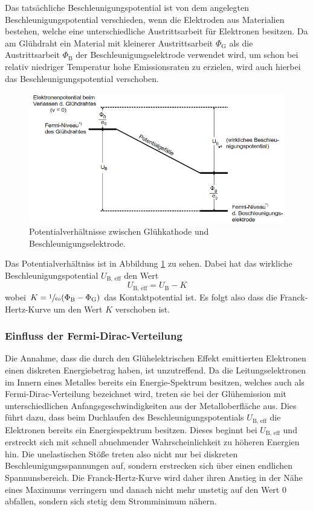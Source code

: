 Das tatsächliche Beschleunigungspotential ist von dem angelegten Beschleunigungspotential
verschieden, wenn die Elektroden aus Materialien bestehen, welche eine unterschiedliche Austrittsarbeit für Elektronen besitzen.
Da am Glühdraht ein Material mit kleinerer Austrittsarbeit $\Phi_\text{G}$ als die Austrittsarbeit $\Phi_\text{B}$ der Beschleunigungselektrode verwendet wird, um schon bei relativ niedriger Temperatur hohe Emissionsraten zu erzielen, wird auch hierbei
das Beschleunigungspotential verschoben. 
\begin{figure}
    \centering
    \caption{Potentialverhältnisse zwischen Glühkathode und Beschleunigungselektrode.\cite{v601}}
    \label{fig:verh}
    \includegraphics[width = 0.6 \textwidth]{pics/potdif.png}
\end{figure}
Das Potentialverhältniss ist in Abbildung \ref{fig:verh} zu sehen. Dabei hat das wirkliche Beschleunigungspotential $U_\text{B, eff}$ den Wert
\begin{equation}
    U_\text{B, eff}= U_\text{B} - K
\end{equation}
wobei $K = \sfrac{1}{e_0} (\Phi_\text{B}-\Phi_\text{G})$ das Kontaktpotential ist. Es folgt also dass die Franck-Hertz-Kurve um den Wert $K$ verschoben ist.

\subsubsection{Einfluss der Fermi-Dirac-Verteilung}

Die Annahme, dass die durch den Glühelektrischen Effekt emittierten Elektronen einen diskreten Energiebetrag haben, ist unzutreffend.
Da die Leitungselektronen im Innern eines Metalles bereits ein Energie-Spektrum besitzen, welches auch als Fermi-Dirac-Verteilung bezeichnet wird, treten sie bei der
Glühemission mit unterschiedlichen Anfangsgeschwindigkeiten aus der Metalloberfläche aus. Dies führt dazu, dass beim Duchlaufen des Beschleunigungspotentials $U_\text{B, eff}$ die Elektronen
bereits ein Energiespektrum besitzen. Dieses beginnt bei $U_\text{B, eff}$ und erstreckt sich mit schnell abnehmender Wahrscheinlichkeit zu höheren Energien hin. 
Die unelastischen Stöße treten also nicht nur bei diskreten Beschleunigungsspannungen auf, sondern erstrecken sich über einen endlichen Spannunsbereich. 
Die Franck-Hertz-Kurve wird daher ihren Anstieg in der Nähe eines Maximums verringern und danach nicht mehr unstetig auf den Wert 0 abfallen, sondern sich stetig dem
Stromminimum nähern. 

